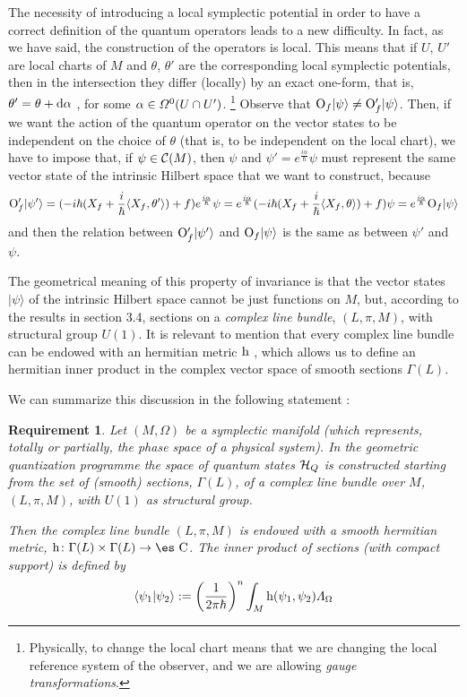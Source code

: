\documentclass[12pt]{article}
\newtheorem{require}{Requirement}
\def\beq{\begin{equation}}
\def\eeq{\end{equation}}
\def\d{{\rm d}}
\def\C{{\cal C}}
\def\H{{\cal H}}
\def\sta{|\psi \rangle }
\def\Op{{\rm O}}
\def\h{{\rm h}}
\def\Complex{\mbox{\es C}}
\def\LF{{\mit\Lambda}_{\Omega}}
\begin{document}
The necessity of introducing a local symplectic potential
in order to have a correct definition of the
quantum operators leads to a new difficulty.
In fact, as we have said,
the construction of the operators is local.
This means that if
$U$, $U'$ are local charts of $M$
and $\theta$, $\theta '$
are the corresponding local symplectic potentials,
then in the intersection
they differ (locally) by an exact one-form,
that is,
$\theta' = \theta + \d \alpha$ ,
for some
$\alpha \in {\mit\Omega}^0(U \cap U')$.%
\footnote
{Physically, to change the local chart means that we are changing
the local reference system of the observer,
and we are allowing {\it gauge transformations}.
}
Observe that $\Op_f\sta \not= \Op '_f\sta$.
Then, if we want the action of the quantum operator
on the vector states to be independent on the choice of $\theta$
(that is, to be independent on the local chart),
we have to impose that, if $\psi \in \C (M)$, then
$\psi$ and
$\psi '= e^{\frac{i \alpha}{\hbar}}\psi$
must represent the same vector state
of the intrinsic Hilbert space that we want to construct, because
$$
\Op '_f |\psi '\rangle =
(-i\hbar (X_f + \frac{i}{\hbar}\langle X_f,\theta '\rangle )
+ f)e^{\frac{i \alpha}{\hbar}}\psi =
e^{\frac{i \alpha}{\hbar}}
(-i\hbar (X_f + \frac{i}{\hbar}\langle X_f,\theta \rangle ) + f)\psi =
e^{\frac{i \alpha}{\hbar}} \Op_f\sta
$$
and then the relation between
$\Op '_f |\psi '\rangle$ and $\Op_f\sta$
is the same as between $\psi '$ and $\psi$.

The geometrical meaning of this property
of invariance is that the vector states $\sta$
of the intrinsic Hilbert space
cannot be just functions on $M$,
but, according to the results in section 3.4,
sections on a {\it complex line bundle}, $(L,\pi ,M)$,
with structural group $U(1)$.
It is relevant to mention that every complex line bundle
can be endowed with an hermitian metric $\h$ \cite{GHV-72},
which allows us to define an hermitian inner product
in the complex vector space of smooth sections $\Gamma (L)$.

We can summarize this discussion in the following statement
\cite{SW-76}:

\begin{require}
Let $(M,\Omega )$ be a symplectic manifold
(which represents, totally or partially,
the phase space of a physical system).
In the geometric quantization programme
the space of quantum states $\H_Q$ is constructed starting from the set
of
(smooth) sections, $\Gamma (L)$,
of a {\rm complex line bundle} over $M$, $(L,\pi ,M)$,
with $U(1)$ as structural group.

Then the complex line bundle
$(L,\pi ,M)$ is endowed with a smooth hermitian metric,
$\h \colon \Gamma (L) \times \Gamma (L) \to \Complex$.
The {\rm inner product} of sections
(with compact support) is defined by
\beq
\langle \psi_1 |\psi_2\rangle  :=
\biggl(\frac{1}{2\pi \hbar}\biggr)^n
\int_M \h (\psi_1,\psi_2) \LF
\label{inprod1}
\eeq
\label{pclb}
\end{require}
\end{document}
